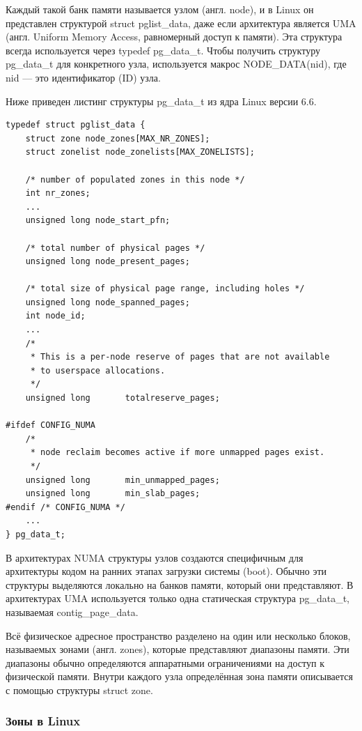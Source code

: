 Каждый такой банк памяти называется узлом (англ. node), и в Linux он представлен структурой {struct pglist\_data}, даже если архитектура является UMA (англ. Uniform Memory Access, равномерный доступ к памяти).
Эта структура всегда используется через {typedef pg\_data\_t}.
Чтобы получить структуру {pg\_data\_t} для конкретного узла, используется макрос {NODE\_DATA(nid)}, где {nid} — это идентификатор (ID) узла.

Ниже приведен листинг структуры pg\_data\_t из ядра Linux версии 6.6.

\begin{lstlisting}[caption={struct pglist\_data}]
typedef struct pglist_data {
	struct zone node_zones[MAX_NR_ZONES];
	struct zonelist node_zonelists[MAX_ZONELISTS];

    /* number of populated zones in this node */
	int nr_zones;
    ...
	unsigned long node_start_pfn;

    /* total number of physical pages */
	unsigned long node_present_pages;

    /* total size of physical page range, including holes */
	unsigned long node_spanned_pages;
	int node_id;
    ...
	/*
	 * This is a per-node reserve of pages that are not available
	 * to userspace allocations.
	 */
	unsigned long		totalreserve_pages;

#ifdef CONFIG_NUMA
	/*
	 * node reclaim becomes active if more unmapped pages exist.
	 */
	unsigned long		min_unmapped_pages;
	unsigned long		min_slab_pages;
#endif /* CONFIG_NUMA */
    ...
} pg_data_t;
\end{lstlisting}

В архитектурах NUMA структуры узлов создаются специфичным для архитектуры кодом на ранних этапах загрузки системы (boot).
Обычно эти структуры выделяются локально на банков памяти, который они представляют.
В архитектурах UMA используется только одна статическая структура {pg\_data\_t}, называемая {contig\_page\_data}.

Всё физическое адресное пространство разделено на один или несколько блоков, называемых зонами (англ. zones), которые представляют диапазоны памяти.
Эти диапазоны обычно определяются аппаратными ограничениями на доступ к физической памяти.
Внутри каждого узла определённая зона памяти описывается с помощью структуры {struct zone}.~\cite{mem}

\subsubsection{Зоны в Linux}

